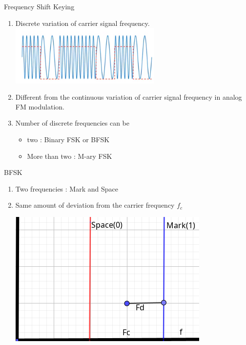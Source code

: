 \documentclass{beamer}
\begin{document}
	
	\begin{frame}{Frequency Shift Keying}
		\begin{enumerate}
			\onslide\item<1-> Discrete variation of carrier signal frequency. 
			\includegraphics[height=30mm]{3.png}
			\onslide\item<2-> Different from the continuous variation of carrier signal frequency in analog FM modulation. 
			\onslide\item<3-> Number of discrete frequencies can be \\
			\begin{itemize}
				\item two : Binary FSK or BFSK
				\item More than two : M-ary FSK
			\end{itemize}  
			
		\end{enumerate}
	\end{frame}
	
	
	
	\begin{frame}{BFSK}
		\begin{enumerate}
			\onslide\item Two frequencies : Mark and Space
			\onslide\item Same amount of deviation from the carrier frequency $f_c$ 
			\vspace{1cm}                                   
			\begin{center}
				\includegraphics[scale=0.4]{11.png}
			\end{center}  
			
		\end{enumerate}
	\end{frame}
	
\end{document}
